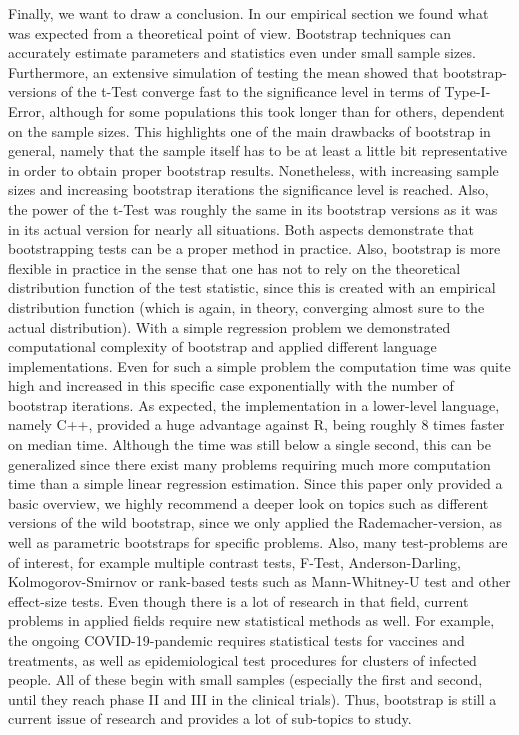 Finally, we want to draw a conclusion. In our empirical section we found what was expected from a theoretical point of view. Bootstrap techniques can accurately estimate parameters and statistics even under small sample sizes. Furthermore, an extensive simulation of testing the mean showed that bootstrap-versions of the t-Test converge fast to the significance level in terms of Type-I-Error, although for some populations this took longer than for others, dependent on the sample sizes. This highlights one of the main drawbacks of bootstrap in general, namely that the sample itself has to be at least a little bit representative in order to obtain proper bootstrap results. Nonetheless, with increasing sample sizes and increasing bootstrap iterations the significance level is reached. Also, the power of the t-Test was roughly the same in its bootstrap versions as it was in its actual version for nearly all situations. Both aspects demonstrate that bootstrapping tests can be a proper method in practice. Also, bootstrap is more flexible in practice in the sense that one has not to rely on the theoretical distribution function of the test statistic, since this is created with an empirical distribution function (which is again, in theory, converging almost sure to the actual distribution). With a simple regression problem we demonstrated computational complexity of bootstrap and applied different language implementations. Even for such a simple problem the computation time was quite high and increased in this specific case exponentially with the number of bootstrap iterations. As expected, the implementation in a lower-level language, namely C++, provided a huge advantage against R, being roughly $8$ times faster on median time. Although the time was still below a single second, this can be generalized since there exist many problems requiring much more computation time than a simple linear regression estimation. Since this paper only provided a basic overview, we highly recommend a deeper look on topics such as different versions of the wild bootstrap, since we only applied the Rademacher-version, as well as parametric bootstraps for specific problems. Also, many test-problems are of interest, for example multiple contrast tests, F-Test, Anderson-Darling, Kolmogorov-Smirnov or rank-based tests such as Mann-Whitney-U test and other effect-size tests. Even though there is a lot of research in that field, current problems in applied fields require new statistical methods as well. For example, the ongoing COVID-19-pandemic requires statistical tests for vaccines and treatments, as well as epidemiological test procedures for clusters of infected people. All of these begin with small samples (especially the first and second, until they reach phase II and III in the clinical trials). Thus, bootstrap is still a current issue of research and provides a lot of sub-topics to study.